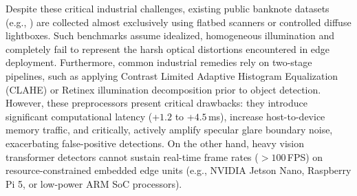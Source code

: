 \documentclass[twocolumn]{svjour3}
\begin{document}
Despite these critical industrial challenges, existing public banknote datasets (e.g., \cite{pham2019vietnamese, lee2017fake}) are collected almost exclusively using flatbed scanners or controlled diffuse lightboxes. Such benchmarks assume idealized, homogeneous illumination and completely fail to represent the harsh optical distortions encountered in edge deployment. Furthermore, common industrial remedies rely on two-stage pipelines, such as applying Contrast Limited Adaptive Histogram Equalization (CLAHE) \cite{zuiderveld1994contrast} or Retinex illumination decomposition \cite{land1977retinex} prior to object detection. However, these preprocessors present critical drawbacks: they introduce significant computational latency (+$1.2$ to +$4.5$\,ms), increase host-to-device memory traffic, and critically, actively amplify specular glare boundary noise, exacerbating false-positive detections. On the other hand, heavy vision transformer detectors \cite{woo2018cbam} cannot sustain real-time frame rates ($>100$\,FPS) on resource-constrained embedded edge units (e.g., NVIDIA Jetson Nano, Raspberry Pi 5, or low-power ARM SoC processors).
\end{document}
